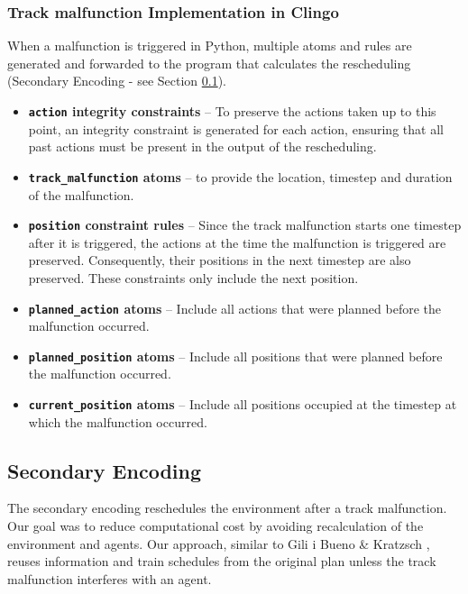 \documentclass[runningheads]{llncs}
\begin{document}
\subsubsection{Track malfunction Implementation in Clingo}\label{fwd_info_2_clingo}

When a malfunction is triggered in Python, multiple atoms and rules are generated and forwarded to the program that calculates the rescheduling (Secondary Encoding - see Section \ref{encoding_2}).

\begin{itemize}
    \item \textbf{\texttt{action} integrity constraints} -- To preserve the actions taken up to this point, an integrity constraint is generated for each action, ensuring that all past actions must be present in the output of the rescheduling.

    \item \textbf{\texttt{track\_malfunction} atoms} -- to provide the location, timestep and duration of the malfunction.

    \item \textbf{\texttt{position} constraint rules} -- Since the track malfunction starts one timestep after it is triggered, the actions at the time the malfunction is triggered are preserved. Consequently, their positions in the next timestep are also preserved. These constraints only include the next position.

    \item \textbf{\texttt{planned\_action} atoms} -- Include all actions that were planned before the malfunction occurred.

    \item \textbf{\texttt{planned\_position} atoms} -- Include all positions that were planned before the malfunction occurred.

    \item \textbf{\texttt{current\_position} atoms} -- Include all positions occupied at the timestep at which the malfunction occurred.
\end{itemize}


\subsection{Secondary Encoding} \label{encoding_2}

The secondary encoding reschedules the environment after a track malfunction. Our goal was to reduce computational cost by avoiding recalculation of the environment and agents. Our approach, similar to Gili i Bueno \& Kratzsch \cite{gilkra2025}, reuses information and train schedules from the original plan unless the track malfunction interferes with an agent. 
\end{document}
